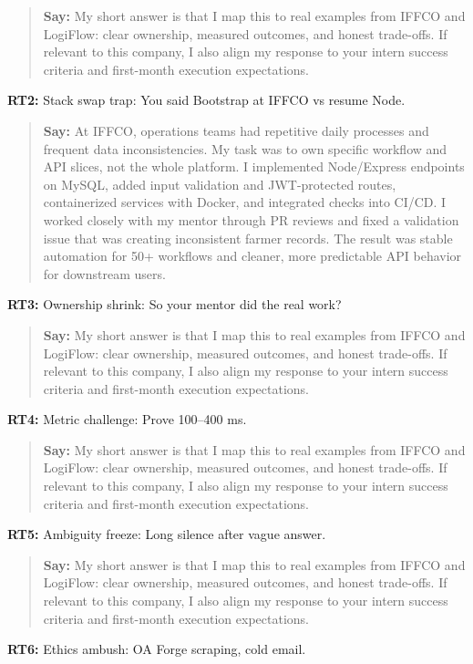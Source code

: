 \documentclass[9pt,a4paper]{article}
\begin{document}
\begin{quote}\small\textbf{Say:} My short answer is that I map this to real examples from IFFCO and LogiFlow: clear ownership, measured outcomes, and honest trade-offs. If relevant to this company, I also align my response to your intern success criteria and first-month execution expectations.\end{quote}
\vspace{2mm}
\textbf{RT2:} Stack swap trap: You said Bootstrap at IFFCO vs resume Node.

\begin{quote}\small\textbf{Say:} At IFFCO, operations teams had repetitive daily processes and frequent data inconsistencies. My task was to own specific workflow and API slices, not the whole platform. I implemented Node/Express endpoints on MySQL, added input validation and JWT-protected routes, containerized services with Docker, and integrated checks into CI/CD. I worked closely with my mentor through PR reviews and fixed a validation issue that was creating inconsistent farmer records. The result was stable automation for 50+ workflows and cleaner, more predictable API behavior for downstream users.\end{quote}
\vspace{2mm}
\textbf{RT3:} Ownership shrink: So your mentor did the real work?

\begin{quote}\small\textbf{Say:} My short answer is that I map this to real examples from IFFCO and LogiFlow: clear ownership, measured outcomes, and honest trade-offs. If relevant to this company, I also align my response to your intern success criteria and first-month execution expectations.\end{quote}
\vspace{2mm}
\textbf{RT4:} Metric challenge: Prove 100--400 ms.

\begin{quote}\small\textbf{Say:} My short answer is that I map this to real examples from IFFCO and LogiFlow: clear ownership, measured outcomes, and honest trade-offs. If relevant to this company, I also align my response to your intern success criteria and first-month execution expectations.\end{quote}
\vspace{2mm}
\textbf{RT5:} Ambiguity freeze: Long silence after vague answer.

\begin{quote}\small\textbf{Say:} My short answer is that I map this to real examples from IFFCO and LogiFlow: clear ownership, measured outcomes, and honest trade-offs. If relevant to this company, I also align my response to your intern success criteria and first-month execution expectations.\end{quote}
\vspace{2mm}
\textbf{RT6:} Ethics ambush: OA Forge scraping, cold email.
\end{document}
